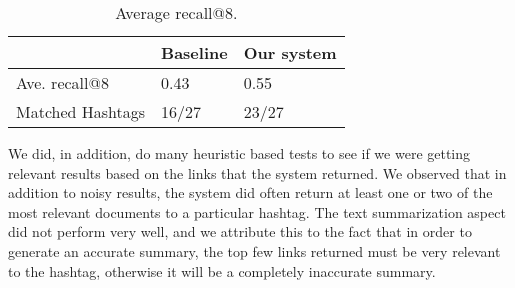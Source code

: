 \begin{table}[h]
    \centering
    \caption[Table caption text]{Average recall@8.}
    \label{table:recall}
    \begin{tabular}{ | l | l | l |} \hline
    & Baseline & Our system \\ \hline
    Ave. recall@8 & 0.43 & 0.55 \\ \hline
    Matched Hashtags & 16/27 & 23/27 \\ \hline
    \end{tabular}
    
We did, in addition, do many heuristic based tests to see if we were getting relevant results based on the links that the system returned. We observed that in addition to noisy results, the system did often return at least one or two of the most relevant documents to a particular hashtag. The text summarization aspect did not perform very well, and we attribute this to the fact that in order to generate an accurate summary, the top few links returned must be very relevant to the hashtag, otherwise it will be a completely inaccurate summary.\\
    
\end{table}